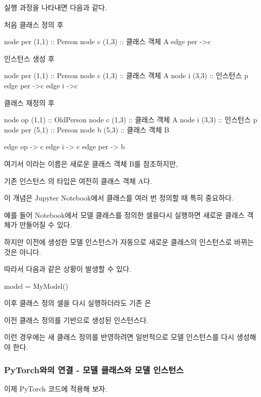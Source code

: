 실행 과정을 나타내면 다음과 같다.

처음 클래스 정의 후

\begin{dhkdiagram}[in=6]
node per (1,1) :: Person
node c (1,3) :: 클래스 객체 A
edge per ->c
\end{dhkdiagram}

인스턴스 생성 후

\begin{dhkdiagram}[in=6]
node per (1,1) :: Person
node c (1,3) :: 클래스 객체 A
node i (3,3) :: 인스턴스 p
edge per ->c
edge i ->c
\end{dhkdiagram}

클래스 재정의 후

\begin{dhkdiagram}[in=6]
node op (1,1) :: OldPerson
node c (1,3) :: 클래스 객체 A
node i (3,3) :: 인스턴스 p
node per (5,1) :: Person
node b (5,3) :: 클래스 객체 B

edge op -> c
edge i -> c
edge per -> b
\end{dhkdiagram}

여기서 이라는 이름은 새로운 클래스 객체 B를 참조하지만,

기존 인스턴스 의 타입은 여전히 클래스 객체 A다.

이 개념은 Jupyter Notebook에서 클래스를 여러 번 정의할 때 특히 중요하다.

예를 들어 Notebook에서 모델 클래스를 정의한 셀을다시 실행하면 새로운 클래스 객체가 만들어질 수 있다.

하지만 이전에 생성한 모델 인스턴스가 자동으로 새로운 클래스의 인스턴스로 바뀌는 것은 아니다.

따라서 다음과 같은 상황이 발생할 수 있다.

\begin{dhkcode}
model = MyModel()
\end{dhkcode}

이후  클래스 정의 셀을 다시 실행하더라도 기존 은

이전 클래스 정의를 기반으로 생성된 인스턴스다.

이런 경우에는 새 클래스 정의를 반영하려면 일반적으로 모델 인스턴스를 다시 생성해야 한다.

\subsubsection{PyTorch와의 연결 - 모델 클래스와 모델 인스턴스}

이제 PyTorch 코드에 적용해 보자.

